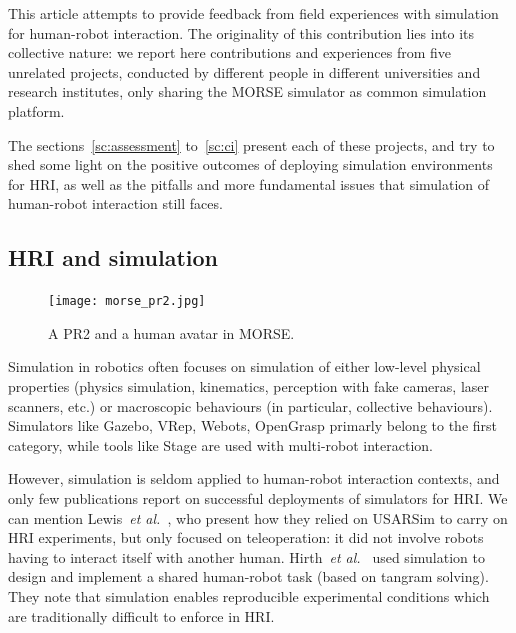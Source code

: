 \documentclass[conference]{IEEEtran}
\newcommand{\etal}{{\textit{et al.~}}}
\begin{document}



This article attempts to provide feedback from field experiences with simulation
for human-robot interaction. The originality of this contribution lies into its
collective nature: we report here contributions and experiences from five
unrelated projects, conducted by different people in different universities and
research institutes, only sharing the MORSE simulator as common simulation
platform.

The sections~\ref{sc:assessment} to~\ref{sc:ci} present each of these projects,
and try to shed some light on the positive outcomes of deploying simulation
environments for HRI, as well as the pitfalls and more fundamental issues that
simulation of human-robot interaction still faces.

\subsection*{HRI and simulation}

\begin{figure}[ht!]
      \centering
      \texttt{[image: morse\_pr2.jpg]}
      \caption{A PR2 and a human avatar in MORSE.}
      \label{fig|morse-hri}
\end{figure}



Simulation in robotics often focuses on simulation of either low-level physical
properties (physics simulation, kinematics, perception with fake cameras, laser
scanners, etc.) or macroscopic behaviours (in particular, collective
behaviours). Simulators like Gazebo, VRep, Webots, OpenGrasp 
primarly belong to the first category, while tools like Stage  are used with multi-robot interaction.

However, simulation is seldom applied to human-robot interaction contexts, and
only few publications report on successful deployments of simulators for HRI.
We can mention Lewis~\etal\cite{lewis2007usarsim}, who present how they relied
on {\sc USARSim} to carry on HRI experiments, but only focused on
teleoperation: it did not involve robots having to interact itself with another
human.  Hirth~\etal\cite{hirth2013development} used simulation to design and
implement a shared human-robot task (based on tangram solving). They note that
simulation enables reproducible experimental conditions which are traditionally
difficult to enforce in HRI.
\end{document}
